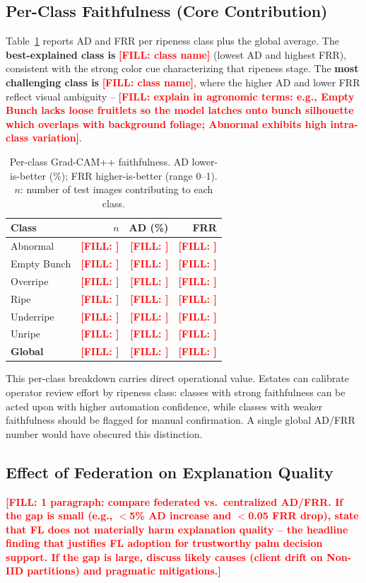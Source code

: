 \documentclass[a4paper,10pt]{article}
\newcommand{\tbd}[1]{\textcolor{red}{\textbf{[FILL: #1]}}}
\begin{document}
\subsection{Per-Class Faithfulness (Core Contribution)}
Table~\ref{tab:xai} reports AD and FRR per ripeness class plus the global
average. The \textbf{best-explained class is} \tbd{class name} (lowest AD and
highest FRR), consistent with the strong color cue characterizing that
ripeness stage. The \textbf{most challenging class is} \tbd{class name}, where
the higher AD and lower FRR reflect visual ambiguity -- \tbd{explain in
agronomic terms: e.g., Empty Bunch lacks loose fruitlets so the model latches
onto bunch silhouette which overlaps with background foliage; Abnormal
exhibits high intra-class variation}.

\begin{table}[ht]
\centering
\caption{Per-class Grad-CAM++ faithfulness. AD lower-is-better (\%); FRR
higher-is-better (range 0--1). $n$: number of test images contributing to
each class.}
\label{tab:xai}
\begin{tabular}{lrrr}
\toprule
\textbf{Class} & \textbf{$n$} & \textbf{AD (\%)} & \textbf{FRR} \\
\midrule
Abnormal     & \tbd{} & \tbd{} & \tbd{} \\
Empty Bunch  & \tbd{} & \tbd{} & \tbd{} \\
Overripe     & \tbd{} & \tbd{} & \tbd{} \\
Ripe         & \tbd{} & \tbd{} & \tbd{} \\
Underripe    & \tbd{} & \tbd{} & \tbd{} \\
Unripe       & \tbd{} & \tbd{} & \tbd{} \\
\midrule
\textbf{Global} & \tbd{} & \tbd{} & \tbd{} \\
\bottomrule
\end{tabular}
\end{table}

This per-class breakdown carries direct operational value. Estates can
calibrate operator review effort by ripeness class: classes with strong
faithfulness can be acted upon with higher automation confidence, while
classes with weaker faithfulness should be flagged for manual confirmation.
A single global AD/FRR number would have obscured this distinction.

\subsection{Effect of Federation on Explanation Quality}
\tbd{1 paragraph: compare federated vs.\ centralized AD/FRR. If the gap is
small (e.g., $<$5\% AD increase and $<$0.05 FRR drop), state that FL does not
materially harm explanation quality -- the headline finding that justifies FL
adoption for trustworthy palm decision support. If the gap is large, discuss
likely causes (client drift on Non-IID partitions) and pragmatic mitigations.}
\end{document}

